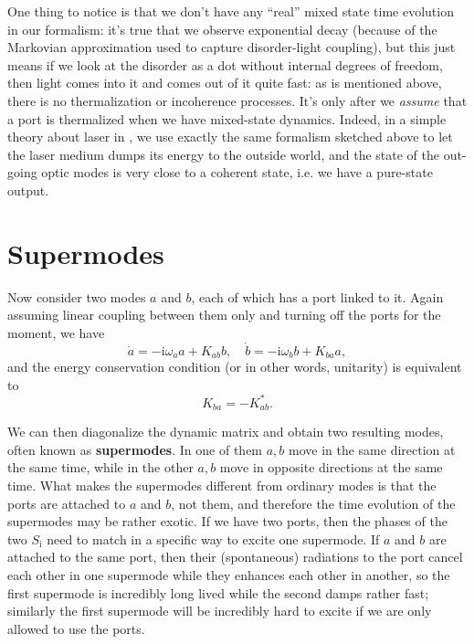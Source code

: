 \documentclass[hyperref, a4paper]{article}
\newcommand*{\ii}{\mathrm{i}}
\newcommand*{\concept}[1]{{\textbf{#1}}}
\newcommand*{\Si}{S_{\text{i}}}
\begin{document}
One thing to notice is that we don't have any ``real'' mixed state time evolution in our formalism:
it's true that we observe exponential decay (because of the Markovian approximation used to capture disorder-light coupling),
but this just means if we look at the disorder as a dot without internal degrees of freedom,
then light comes into it and comes out of it quite fast:
as is mentioned above, there is no thermalization or incoherence processes.
It's only after we \emph{assume} that a port is thermalized when we have mixed-state dynamics.
Indeed, in a simple theory about laser in ,
we use exactly the same formalism sketched above to let the laser medium dumps its energy to the outside world,
and the state of the out-going optic modes is very close to a coherent state, i.e. we have a pure-state output.

\section{Supermodes}

Now consider two modes $a$ and $b$, 
each of which has a port linked to it.
Again assuming linear coupling between them only and turning off the ports for the moment, we have 
\begin{equation}
    \dot{a} = - \ii \omega_a a + K_{ab} b, \quad 
    \dot{b} = - \ii \omega_b b + K_{ba} a,
\end{equation}
and the energy conservation condition (or in other words, unitarity) is equivalent to
\begin{equation}
    K_{ba} = - K_{ab}^*.
\end{equation}

We can then diagonalize the dynamic matrix and obtain two resulting modes, 
often known as \concept{supermodes}.
In one of them $a, b$ move in the same direction at the same time, 
while in the other $a, b$ move in opposite directions at the same time.
What makes the supermodes different from ordinary modes is that 
the ports are attached to $a$ and $b$, not them, 
and therefore the time evolution of the supermodes may be rather exotic.
If we have two ports, then the phases of the two $\Si$ need to match in a specific way 
to excite one supermode. 
If $a$ and $b$ are attached to the same port, 
then their (spontaneous) radiations to the port cancel each other in one supermode 
while they enhances each other in another, 
so the first supermode is incredibly long lived 
while the second damps rather fast; 
similarly the first supermode will be incredibly hard to excite 
if we are only allowed to use the ports.
\end{document}

